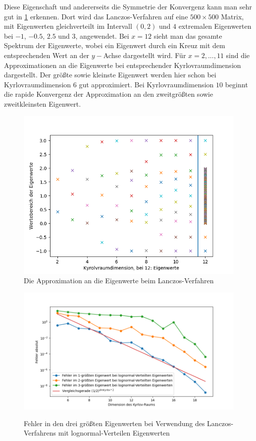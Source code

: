 \documentclass{article}
\theoremstyle{plain}
\begin{document}
Diese Eigenschaft und andererseits die Symmetrie der Konvergenz kann man sehr gut in \ref{eigv_lanczos} erkennen. Dort wird das Lanczos-Verfahren auf eine $500 \times 500$ Matrix, mit Eigenwerten gleichverteilt im Intervall $(0,2)$ und $4$ extremalen Eigenwerten bei $-1$, $-0.5$, $2.5$ und $3$, angewendet. Bei $x = 12$ sieht man das gesamte Spektrum der Eigenwerte, wobei ein Eigenwert durch ein Kreuz mit dem entsprechenden Wert an der $y-$Achse dargestellt wird. Für $x = 2,...,11$ sind die Approximationen an die Eigenwerte bei entsprechender Kyrlovraumdimension dargestellt. Der größte sowie kleinste Eigenwert werden hier schon bei Kyrlovraumdimension $6$ gut approximiert. Bei Kyrlovraumdimension $10$ beginnt die rapide Konvergenz der Approximation an den zweitgrößten sowie zweitkleinsten Eigenwert.


\begin{figure}[H]\label{eigv_lanczos}
	\begin{center}
		\includegraphics[width = 0.7 \linewidth]{Plots/eigv_kyrlov_approx}
		\caption{Die Approximation an die Eigenwerte beim Lanczos-Verfahren}
	\end{center}
\end{figure}



\begin{figure}[H]
\begin{center}
	\includegraphics[width = 0.7 \linewidth]{Plots/lanczos_lognormal}\label{lanczos_lognomal}
	\caption{Fehler in den drei größten Eigenwerten bei Verwendung des Lanczos-Verfahrens mit lognormal-Verteilen Eigenwerten}
	\end{center}
\end{figure}
\end{document}
